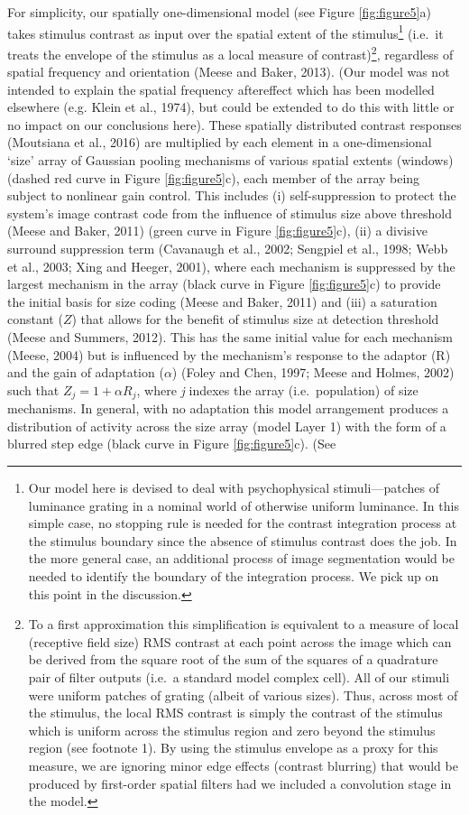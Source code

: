 \documentclass[
]{article}
\begin{document}
For simplicity, our spatially one-dimensional model (see Figure \ref{fig:figure5}a) takes stimulus contrast as input over the spatial extent of the stimulus\footnote{Our model here is devised to deal with psychophysical stimuli---patches of luminance grating in a nominal world of otherwise uniform luminance. In this simple case, no stopping rule is needed for the contrast integration process at the stimulus boundary since the absence of stimulus contrast does the job. In the more general case, an additional process of image segmentation would be needed to identify the boundary of the integration process. We pick up on this point in the discussion.} (i.e.~it treats the envelope of the stimulus as a local measure of contrast)\footnote{To a first approximation this simplification is equivalent to a measure of local (receptive field size) RMS contrast at each point across the image which can be derived from the square root of the sum of the squares of a quadrature pair of filter outputs (i.e.~a standard model complex cell). All of our stimuli were uniform patches of grating (albeit of various sizes). Thus, across most of the stimulus, the local RMS contrast is simply the contrast of the stimulus which is uniform across the stimulus region and zero beyond the stimulus region (see footnote 1). By using the stimulus envelope as a proxy for this measure, we are ignoring minor edge effects (contrast blurring) that would be produced by first-order spatial filters had we included a convolution stage in the model.}, regardless of spatial frequency and orientation (Meese and Baker, 2013). (Our model was not intended to explain the spatial frequency aftereffect which has been modelled elsewhere (e.g. Klein et al., 1974), but could be extended to do this with little or no impact on our conclusions here). These spatially distributed contrast responses (Moutsiana et al., 2016) are multiplied by each element in a one-dimensional `size' array of Gaussian pooling mechanisms of various spatial extents (windows) (dashed red curve in Figure \ref{fig:figure5}c), each member of the array being subject to nonlinear gain control. This includes (i) self-suppression to protect the system's image contrast code from the influence of stimulus size above threshold (Meese and Baker, 2011) (green curve in Figure \ref{fig:figure5}c), (ii) a divisive surround suppression term (Cavanaugh et al., 2002; Sengpiel et al., 1998; Webb et al., 2003; Xing and Heeger, 2001), where each mechanism is suppressed by the largest mechanism in the array (black curve in Figure \ref{fig:figure5}c) to provide the initial basis for size coding (Meese and Baker, 2011) and (iii) a saturation constant (\(Z\)) that allows for the benefit of stimulus size at detection threshold (Meese and Summers, 2012). This has the same initial value for each mechanism (Meese, 2004) but is influenced by the mechanism's response to the adaptor (R) and the gain of adaptation (\(\alpha\)) (Foley and Chen, 1997; Meese and Holmes, 2002) such that \(Z_j = 1 + \alpha R_j\), where \emph{j} indexes the array (i.e.~population) of size mechanisms. In general, with no adaptation this model arrangement produces a distribution of activity across the size array (model Layer 1) with the form of a blurred step edge (black curve in Figure \ref{fig:figure5}c). (See 
\end{document}
